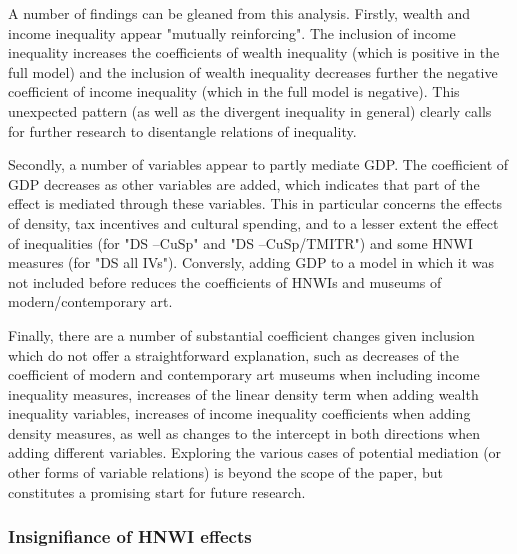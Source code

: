 \documentclass[11pt]{article}
\begin{document}
A number of findings can be gleaned from this analysis.
Firstly, wealth and income inequality appear "mutually reinforcing".
The inclusion of income inequality increases the coefficients of wealth inequality (which is positive in the full model) and the inclusion of wealth inequality decreases further the negative coefficient of income inequality (which in the full model is negative).
This unexpected pattern (as well as the divergent inequality in general) clearly calls for further research to disentangle relations of inequality.


Secondly, a number of variables appear to partly mediate GDP.
The coefficient of GDP decreases as other variables are added, which indicates that part of the effect is mediated through these variables.
This in particular concerns the effects of density, tax incentives and cultural spending, and to a lesser extent the effect of inequalities (for "DS --CuSp" and "DS --CuSp/TMITR") and some HNWI measures (for "DS all IVs").
Conversly, adding GDP to a model in which it was not included before reduces the coefficients of HNWIs and museums of modern/contemporary art.


Finally, there are a number of substantial coefficient changes given inclusion which do not offer a straightforward explanation, such as decreases of the coefficient of modern and contemporary art museums when including income inequality measures, increases of the linear density term when adding wealth inequality variables, increases of income inequality coefficients when adding density measures, as well as changes to the intercept in both directions when adding different variables. 
Exploring the various cases of potential mediation (or other forms of variable relations) is beyond the scope of the paper, but constitutes a promising start for future research.



\subsubsection{Insignifiance of HNWI effects}
\end{document}
